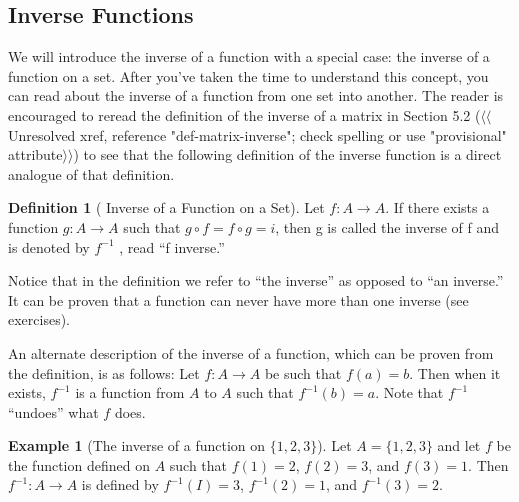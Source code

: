 \documentclass[10pt,]{book}
\theoremstyle{plain}
\theoremstyle{definition}
\newtheorem{definition}[theorem]{Definition}
\theoremstyle{definition}
\newtheorem{example}[theorem]{Example}
\theoremstyle{definition}
\begin{document}
\subsection[Inverse Functions]{Inverse Functions}\label{ss-inverse-functions}
We will introduce the inverse of a function with a special case: the inverse of a function on a set. After you've taken the time to understand this
concept, you can read about the inverse of a function from one set into another. The reader is encouraged to reread the definition of the inverse
of a matrix in Section 5.2 ({$\langle\langle$Unresolved xref, reference "def-matrix-inverse"; check spelling or use "provisional" attribute$\rangle\rangle$}) to see that the following definition of the inverse function is a direct analogue of that definition.%
\begin{definition}[ Inverse of a Function on a Set]\label{def-inverse-function}
\label{notation-8}
 Let \(f: A\rightarrow  A\). If there exists a function \(g : A \rightarrow  A\) such that \(g\circ f = f\circ g = i\), then g is called the inverse of f and is denoted by \(f^{-1}\) , read ``f inverse.''%
\end{definition}
\par
Notice that in the definition we refer to ``the inverse'' as opposed to ``an inverse.''  It can be proven that a function can never have
more than one inverse (see exercises).%
\par
An alternate description of the inverse of a function, which can be proven from the definition, is as follows:  Let \(f: A \rightarrow  A\) be such that \(f(a) = b\). Then when it exists, \(f^{-1}\) is a function from \(A\) to \(A\) such that \(f^{-1}(b)=a\).
Note that \(f^{-1}\) ``undoes'' what \(f\) does. %
\begin{example}[The inverse of a function on \(\{1,2,3\}\)]\label{ex-simple-inverse}
Let \(A = \{1, 2, 3\}\) and let \(f\) be the function defined on \(A\) such that \(f(1) = 2\), \(f(2) = 3\), and
\(f(3) = 1\). Then \(f^{-1} : A \rightarrow  A\) is defined by \(f^{-1}(I) = 3\), \(f^{-1}(2) = 1\), and \(f^{-1}(3) = 2\).%
\end{example}
\end{document}
